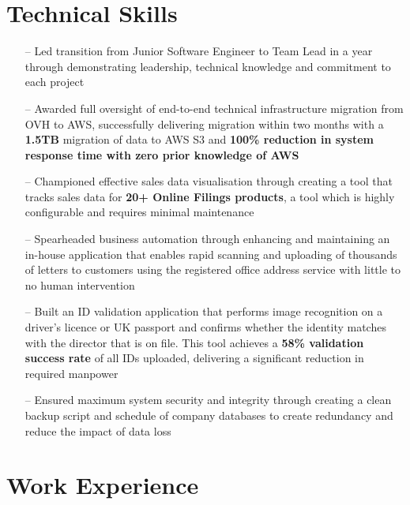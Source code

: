 \documentclass[a4paper,12pt]{article}
\begin{document}
\section{Technical Skills}
\begin{itemize}[nosep,after=\strut, leftmargin=1em, itemsep=3pt]
    \item[--] Led transition from Junior Software Engineer to Team Lead in a year through demonstrating leadership, technical knowledge and commitment to each project
    \item[--] Awarded full oversight of end-to-end technical infrastructure migration from OVH to AWS, successfully delivering migration within two months with a \textbf{1.5TB} migration of data to AWS S3 and \textbf{100\% reduction in system response time with zero prior knowledge of AWS}
    \item[--] Championed effective sales data visualisation through creating a tool that tracks sales data for \textbf{20+ Online Filings products}, a tool which is highly configurable and requires minimal maintenance
    \item[--] Spearheaded business automation through enhancing and maintaining an in-house application that enables rapid scanning and uploading of thousands of letters to customers using the registered office address service with little to no human intervention
    \item[--] Built an ID validation application that performs image recognition on a driver’s licence or UK passport and confirms whether the identity matches with the director that is on file. This tool achieves a \textbf{58\% validation success rate} of all IDs uploaded, delivering a significant reduction in required manpower
    \item[--] Ensured maximum system security and integrity through creating a clean backup script and schedule of company databases to create redundancy and reduce the impact of data loss
\end{itemize}

\section{Work Experience}
\end{document}
